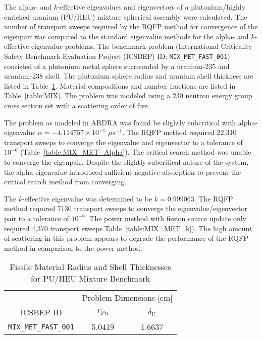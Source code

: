 The alpha- and $k$-effective eigenvalues and eigenvectors of a plutonium/highly enriched uranium (PU/HEU) mixture spherical assembly were calculated. The number of transport sweeps required by the RQFP method for convergence of the eigenpair was compared to the standard eigenvalue methods for the alpha- and $k$-effective eigenvalue problems. The benchmark problem (International Criticality Safety Benchmark Evaluation Project (ICSBEP) ID: \texttt{MIX\_MET\_FAST\_001}) consisted of a plutonium metal sphere surrounded by a uranium-235 and uranium-238 shell. The plutonium sphere radius and uranium shell thickness are listed in Table~\ref{table:MIX_MET_Dims}. Material compositions and number fractions are listed in Table~\ref{table:MIX}. The problem was modeled using a 230 neutron energy group cross section set with a scattering order of five. 

The problem as modeled in ARDRA was found be slightly subcritical with alpha-eigen\-value $\alpha = -4.114757 \times 10^{-1}$ $\mu s^{-1}$. The RQFP method required 22,310 transport sweeps to converge the eigenvalue and eigenvector to a tolerance of $10^{-6}$ (Table~\ref{table:MIX_MET_Alpha}). The critical search method was unable to converge the eigenpair. Despite the slightly subcritical nature of the system, the alpha-eigenvalue introduced sufficient negative absorption to prevent the critical search method from converging.

The $k$-effective eigenvalue was determined to be $k = 0.999063$. The RQFP method required 7130 transport sweeps to converge the eigenvalue/eigenvector pair to a tolerance of $10^{-6}$. The power method with fission source update only required 4,370 transport sweeps Table~\ref{table:MIX_MET_k}). The high amount of scattering in this problem appears to degrade the performance of the RQFP method in comparison to the power method.

\begin{table}[!htbp]
	\centering{}
	\begin{tabular}{@{}ccc@{}}\toprule
	& \multicolumn{2}{c}{Problem Dimensions [cm]} \\
	\cmidrule{2-3} ICSBEP ID & $r_{\text{Pu}}$ & $\delta_{\text{U}}$ \\
	\midrule
	\texttt{MIX\_MET\_FAST\_001} & 5.0419 & 1.6637 \\
	\bottomrule
	\end{tabular}
	\caption{Fissile Material Radius and Shell Thicknesses for PU/HEU Mixture Benchmark}
	\label{table:MIX_MET_Dims}
\end{table}

